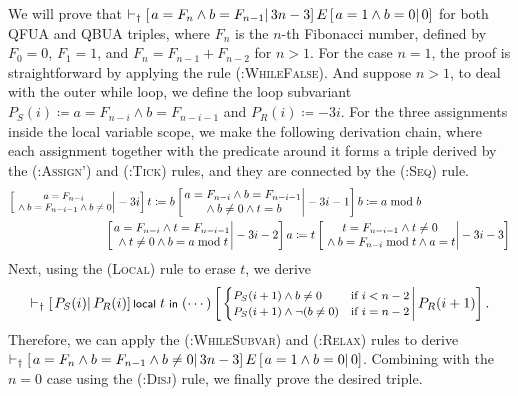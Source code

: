 We will prove that $\vdash_{\text{\textdagger}}\left[\left.a=F_n\land b=F_{n-1}\right|3n-3\right]E\left[\left.a=1\land b=0\right|0\right]$ for both QFUA and QBUA triples, where $F_n$ is the $n$-th Fibonacci number, defined by $F_0=0$, $F_1=1$, and $F_n=F_{n-1}+F_{n-2}$ for $n>1$.
For the case $n=1$, the proof is straightforward by applying the rule \textsc{(\textdagger:WhileFalse)}.
And suppose $n>1$, to deal with the outer while loop, we define the loop subvariant $P_S(i)\coloneqq a=F_{n-i}\land b=F_{n-i-1}$ and $P_R(i)\coloneqq -3i$.
For the three assignments inside the local variable scope, we make the following derivation chain, where each assignment together with the predicate around it forms a triple derived by the \textsc{(\textdagger:Assign')} and \textsc{(\textdagger:Tick)} rules, and they are connected by the \textsc{(\textdagger:Seq)} rule.
\begin{align*}\footnotesize
  \SR{\begin{matrix}
    a=F_{n-i}\\{}\land b=F_{n-i-1}\land b\ne 0
  \end{matrix}}{-3i}
  \Assign{t}{b}
  &\SR{\begin{matrix}
    a=F_{n-i}\land b=F_{n-i-1}\\{}\land b\ne 0\land t=b
  \end{matrix}}{-3i-1}
  \Assign{b}{a\bmod b}\\
  &\hspace{-6em}\SR{\begin{matrix}
    a=F_{n-i}\land t=F_{n-i-1}\\{}\land t\ne 0\land b=a\bmod t
  \end{matrix}}{-3i-2}
  \Assign{a}{t}
  \SR{\begin{matrix}
    t=F_{n-i-1}\land t\ne 0\\{}\land b=F_{n-i}\bmod t\land a=t
  \end{matrix}}{-3i-3}
\end{align*}
Next, using the \textsc{(Local)} rule to erase $t$, we derive
\begin{align*}\footnotesize
  \vdash_{\text{\textdagger}}\left[\left.P_S(i)\right|P_R(i)\right]\textsf{local}~t~\textsf{in}~(\cdots)\left[\left.\begin{cases}P_S(i+1)\land b\ne 0&\text{if }i<n-2\\P_S(i+1)\land\neg(b\ne 0)&\text{if }i=n-2\end{cases}\right|P_R(i+1)\right].
\end{align*}
Therefore, we can apply the \textsc{(\textdagger:WhileSubvar)} and \textsc{(\textdagger:Relax)} rules to derive $\vdash_{\text{\textdagger}}\left[\left.a=F_n\land b=F_{n-1}\land b\ne 0\right|3n-3\right]E\left[\left.a=1\land b=0\right|0\right]$. Combining with the $n=0$ case using the \textsc{(\textdagger:Disj)} rule, we finally prove the desired triple.

